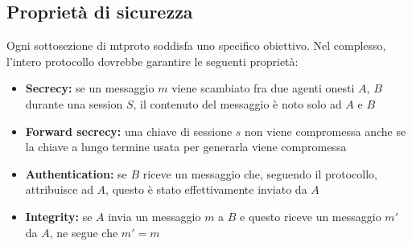 \subsection{Proprietà di sicurezza}
Ogni sottosezione di \gls{mtproto} soddisfa uno specifico obiettivo.
Nel complesso, l'intero protocollo dovrebbe garantire le seguenti proprietà:
\begin{itemize}
    \item \textbf{Secrecy:} se un messaggio $m$ viene scambiato fra due agenti onesti $A$, $B$ durante una session $S$, 
    il contenuto del messaggio è noto solo ad $A$ e $B$
    \item \textbf{Forward secrecy:} una chiave di sessione $s$ non viene compromessa 
    anche se la chiave a lungo termine usata per generarla viene compromessa
    \item \textbf{Authentication:} se $B$ riceve un messaggio che, seguendo il protocollo,
    attribuisce ad $A$, questo è stato effettivamente inviato da $A$
    \item \textbf{Integrity:} se $A$ invia un messaggio $m$ a $B$ 
    e questo riceve un messaggio $m'$ da $A$, ne segue che $m' = m$
\end{itemize}